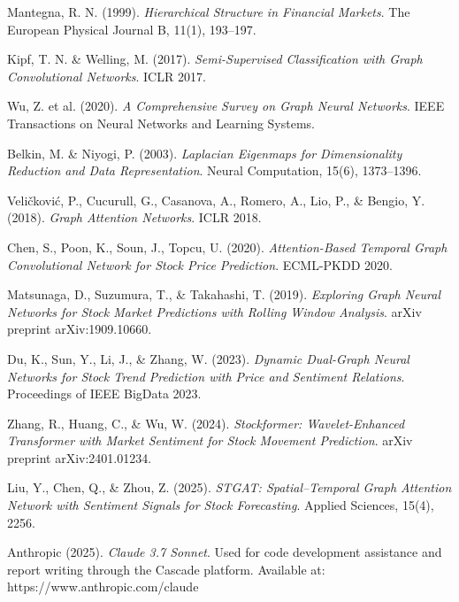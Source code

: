 \documentclass[12pt]{article}
\begin{document}
\newpage


\begin{thebibliography}{12}

Mantegna, R. N. (1999). 
\textit{Hierarchical Structure in Financial Markets}. 
The European Physical Journal B, 11(1), 193--197.

Kipf, T. N. \& Welling, M. (2017). 
\textit{Semi-Supervised Classification with Graph Convolutional Networks}. 
ICLR 2017.

Wu, Z. et al. (2020). 
\textit{A Comprehensive Survey on Graph Neural Networks}. 
IEEE Transactions on Neural Networks and Learning Systems.

Belkin, M. \& Niyogi, P. (2003). 
\textit{Laplacian Eigenmaps for Dimensionality Reduction and Data Representation}. 
Neural Computation, 15(6), 1373--1396.

Veličković, P., Cucurull, G., Casanova, A., Romero, A., Lio, P., \& Bengio, Y. (2018).
\textit{Graph Attention Networks}.
ICLR 2018.

Chen, S., Poon, K., Soun, J., Topcu, U. (2020).
\textit{Attention-Based Temporal Graph Convolutional Network for Stock Price Prediction}.
ECML-PKDD 2020.

Matsunaga, D., Suzumura, T., \& Takahashi, T. (2019).
\textit{Exploring Graph Neural Networks for Stock Market Predictions with Rolling Window Analysis}.
arXiv preprint arXiv:1909.10660.

Du, K., Sun, Y., Li, J., \& Zhang, W. (2023).
\textit{Dynamic Dual-Graph Neural Networks for Stock Trend Prediction with Price and Sentiment Relations}.
Proceedings of IEEE BigData 2023.

Zhang, R., Huang, C., \& Wu, W. (2024).
\textit{Stockformer: Wavelet-Enhanced Transformer with Market Sentiment for Stock Movement Prediction}.
arXiv preprint arXiv:2401.01234.

Liu, Y., Chen, Q., \& Zhou, Z. (2025).
\textit{STGAT: Spatial–Temporal Graph Attention Network with Sentiment Signals for Stock Forecasting}.
Applied Sciences, 15(4), 2256.

Anthropic (2025).
\textit{Claude 3.7 Sonnet}.
Used for code development assistance and report writing through the Cascade platform.
Available at: https://www.anthropic.com/claude

\end{thebibliography}
\end{document}
